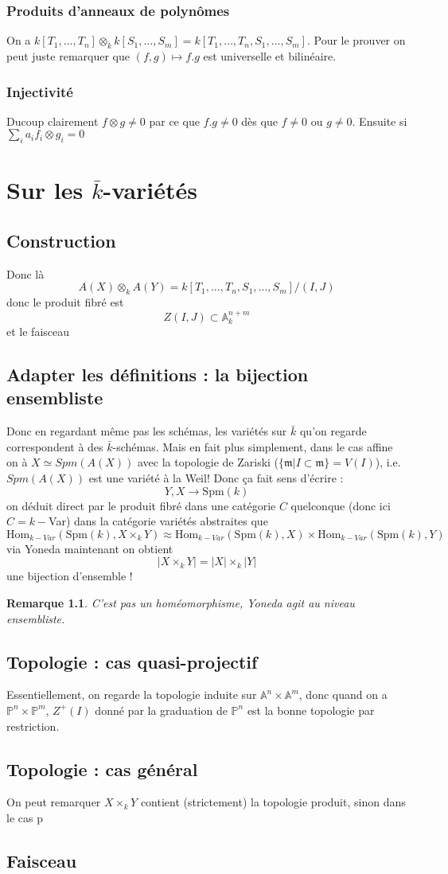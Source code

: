 \documentclass[a4paper,12pt]{book}
\newcommand{\A}{\mathbb{A}}
\newcommand{\Hom}{\textrm{Hom}}
\newcommand{\Spm}{\textrm{Spm}}
\newcommand{\m}{\mathfrak{m}}
\renewcommand{\Pr}{\mathbb{P}}
\theoremstyle{plain}
\newtheorem{rem}{Remarque}
\theoremstyle{definition}
\theoremstyle{remark}
\begin{document}
\subsection{Produits d'anneaux de polynômes}
On a 
$k[T_1,\ldots, T_n]\otimes_k k[S_1,\ldots,S_m]=k[T_1,\ldots, T_n,S_1,\ldots, S_m]$.
Pour le prouver on peut juste remarquer que $(f,g)\mapsto f.g$
est universelle et bilinéaire. 

\subsection{Injectivité}
Ducoup clairement $f\otimes g\ne0$  par ce que $f.g\ne 0$ dès
que $f\ne 0$ ou $g\ne 0$. Ensuite si $\sum_i a_i f_i\otimes g_i=0$

\chapter{Sur les $\bar k$-variétés}
\section{Construction}
Donc là 
\[A(X)\otimes_k A(Y)=k[T_1,\ldots, T_n, S_1,\ldots, S_m]/(I,J)\]
donc le produit fibré est 
\[Z(I,J)\subset \A_k^{n+m}\]
et le faisceau
\section{Adapter les définitions : la bijection ensembliste}
Donc en regardant même pas les schémas, les variétés sur $\bar k$
qu'on regarde correspondent à des $\bar k$-schémas. Mais en 
fait plus simplement, dans le cas affine on à $X\simeq Spm(A(X))$
avec la topologie de Zariski ($\{\m|I\subset \m\}=V(I)$), i.e.
$Spm(A(X))$ est une variété à la Weil! Donc ça fait sens d'écrire :
\[Y,X\to \Spm(k)\]
on déduit direct par le produit fibré dans une catégorie $C$ 
quelconque (donc ici $C=k-$Var) dans la catégorie variétés
abstraites que
\[\Hom_{k-Var}(\Spm(k), X\times_k Y)\approx \Hom_{k-Var}(\Spm(k),X)
\times \Hom_{k-Var}(\Spm(k),Y)\]
via Yoneda maintenant on obtient 
\[|X\times_k Y|=|X|\times_k|Y|\]
une bijection d'ensemble !

\begin{rem}
  C'est pas un homéomorphisme, Yoneda agit au niveau ensembliste.
\end{rem}
\section{Topologie : cas quasi-projectif}
Essentiellement, on regarde la topologie induite sur $\A^n\times
\A^m$, donc quand on a $\Pr^n\times \Pr^m$, $Z^+(I)$ donné par 
la graduation de $\Pr^n$ est la bonne topologie par restriction.

\section{Topologie : cas général}
On peut remarquer $X\times_k Y$ contient (strictement) la topologie
produit, sinon dans le cas p
\section{Faisceau}

\printbibliography
\end{document}
